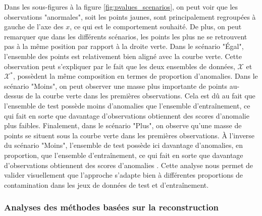 Dans les \DIFdelbegin {}\DIFdelend \DIFaddbegin {}\DIFaddend sous-figures à la figure \ref{fig:pvalues_scenarios}, on peut voir que les observations "anormales", soit les points jaunes, sont principalement regroupées à gauche de l'axe des $x$, ce qui est le comportement souhaité. De plus, on peut remarquer que dans les \DIFdelbegin {}\DIFdelend \DIFaddbegin {}\DIFaddend différents scénarios, les points les plus \DIFdelbegin {}\DIFdelend \DIFaddbegin {}\DIFaddend ne se retrouvent pas à la même position par rapport à la droite verte. Dans le scénario "Égal", l'ensemble des points est relativement bien aligné avec la courbe verte. Cette observation peut s'expliquer par le fait que les deux ensembles de données, $\mathcal{X}$ et $\mathcal{X^*}$, possèdent la même composition en termes de proportion d'anomalies. Dans le scénario "Moins", on peut observer une masse plus importante de points au-dessus de la courbe verte dans les premières observations. Cela est dû au fait que l'ensemble de test possède moins d'anomalies que l'ensemble d'entraînement, ce qui fait en sorte que davantage d'observations obtiennent des scores d'anomalie plus faibles. Finalement, dans le scénario "Plus", on observe qu'une masse de points se situent sous la courbe verte dans les premières observations. À l'inverse du scénario "Moins", l'ensemble de test possède ici davantage d'anomalies, en proportion, que l'ensemble d'entraînement, ce qui fait en sorte que davantage d'observations obtiennent des scores d'anomalies \DIFdelbegin {}\DIFdelend \DIFaddbegin {}\DIFaddend . Cette analyse nous permet de valider visuellement que l'approche s'adapte bien à différentes proportions de contamination dans les jeux de données de test et d'entraînement.

\subsubsection{Analyses des méthodes basées sur la reconstruction} \label{imagenet:reconsruction}


